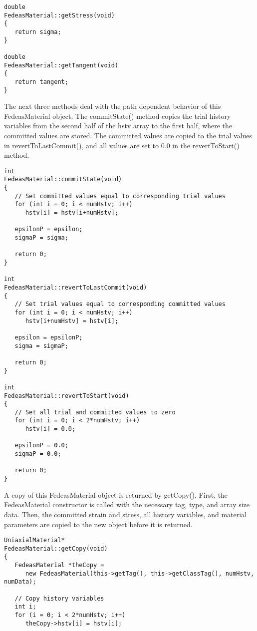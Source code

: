 \documentclass[12pt]{article}
\begin{document}
{{\begin{verbatim}
double
FedeasMaterial::getStress(void)
{
   return sigma;
}

double
FedeasMaterial::getTangent(void)
{
   return tangent;
}
\end{verbatim}
}

\noindent The next three methods deal with the path dependent behavior of this
FedeasMaterial object. The commitState() method copies the trial history variables
from the second half of the hstv array to the first half, where the committed values are
stored. The committed values are copied to the trial values in revertToLastCommit(),
and all values are set to $0.0$ in the revertToStart() method.

{\sf\small
\begin{verbatim}
int
FedeasMaterial::commitState(void)
{
   // Set committed values equal to corresponding trial values
   for (int i = 0; i < numHstv; i++)
      hstv[i] = hstv[i+numHstv];
     
   epsilonP = epsilon;
   sigmaP = sigma;
     
   return 0;
}

int
FedeasMaterial::revertToLastCommit(void)
{
   // Set trial values equal to corresponding committed values
   for (int i = 0; i < numHstv; i++)
      hstv[i+numHstv] = hstv[i];
     
   epsilon = epsilonP;
   sigma = sigmaP;
     
   return 0;
}

int
FedeasMaterial::revertToStart(void)
{
   // Set all trial and committed values to zero
   for (int i = 0; i < 2*numHstv; i++)
      hstv[i] = 0.0;
     
   epsilonP = 0.0;
   sigmaP = 0.0;
     
   return 0;
}
\end{verbatim}
}

\noindent A copy of this FedeasMaterial object is returned by getCopy(). First, the
FedeasMaterial constructor is called with the necessary tag, type, and array size data.
Then, the committed strain and stress, all history variables, and material parameters
are copied to the new object before it is returned.

{\sf\small
\begin{verbatim}
UniaxialMaterial*
FedeasMaterial::getCopy(void)
{
   FedeasMaterial *theCopy = 
      new FedeasMaterial(this->getTag(), this->getClassTag(), numHstv, numData);
     
   // Copy history variables
   int i;
   for (i = 0; i < 2*numHstv; i++)
      theCopy->hstv[i] = hstv[i];
     

\end{verbatim}}}
\end{document}
